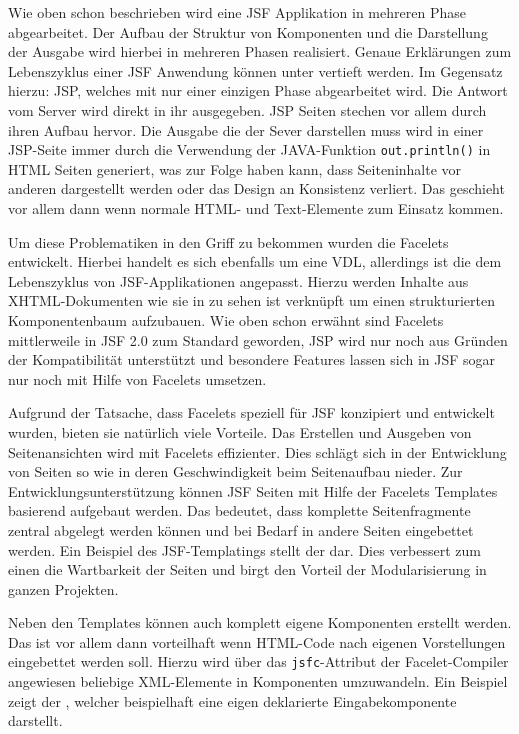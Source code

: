 \documentclass[12pt, twoside, a4paper, ngerman]{article}
\begin{document}
Wie oben schon beschrieben wird eine JSF Applikation in mehreren Phase abgearbeitet. Der Aufbau der Struktur von Komponenten und die Darstellung der Ausgabe wird hierbei in mehreren Phasen realisiert. Genaue Erklärungen zum Lebenszyklus einer JSF Anwendung können unter \cite{IrianLfCycl} vertieft werden.
Im Gegensatz hierzu: JSP, welches mit nur einer einzigen Phase abgearbeitet wird. Die Antwort vom Server wird direkt in ihr ausgegeben. JSP Seiten stechen vor allem durch ihren Aufbau hervor.
Die Ausgabe die der Sever darstellen muss wird in einer JSP-Seite immer durch die Verwendung der JAVA-Funktion \texttt{out.println()} in HTML Seiten generiert, was zur Folge haben kann, dass Seiteninhalte vor anderen dargestellt werden oder das Design an Konsistenz verliert. Das geschieht vor allem dann wenn normale HTML- und Text-Elemente zum Einsatz kommen.

Um diese Problematiken in den Griff zu bekommen wurden die Facelets entwickelt. Hierbei handelt es sich ebenfalls um eine VDL, allerdings ist die dem Lebenszyklus von JSF-Applikationen angepasst.
Hierzu werden Inhalte aus XHTML-Dokumenten wie sie in  
 zu sehen ist verknüpft um einen strukturierten Komponentenbaum aufzubauen.
Wie oben schon erwähnt sind Facelets mittlerweile in JSF 2.0 zum Standard geworden, JSP wird nur noch aus Gründen der Kompatibilität unterstützt und besondere Features lassen sich in JSF sogar nur noch mit Hilfe von Facelets umsetzen. 

Aufgrund der Tatsache, dass Facelets speziell für JSF konzipiert und entwickelt wurden, bieten sie natürlich viele Vorteile.
Das Erstellen und Ausgeben von Seitenansichten wird mit Facelets effizienter. 
Dies schlägt sich in der Entwicklung von Seiten so wie in deren Geschwindigkeit beim Seitenaufbau nieder.
Zur Entwicklungsunterstützung können JSF Seiten mit Hilfe der Facelets Templates basierend aufgebaut werden. Das bedeutet, dass komplette Seitenfragmente zentral abgelegt werden können und bei Bedarf in andere Seiten eingebettet werden. Ein Beispiel des JSF-Templatings stellt der  dar.
Dies verbessert zum einen die Wartbarkeit der Seiten und birgt den Vorteil der Modularisierung in ganzen Projekten.

Neben den Templates können auch komplett eigene Komponenten erstellt werden. Das ist vor allem dann vorteilhaft wenn HTML-Code nach eigenen Vorstellungen eingebettet werden soll.
Hierzu wird über das \texttt{jsfc}-Attribut der Facelet-Compiler angewiesen beliebige XML-Elemente in Komponenten umzuwandeln. 
Ein Beispiel zeigt der 
, welcher beispielhaft eine eigen deklarierte Eingabekomponente darstellt.
\end{document}
